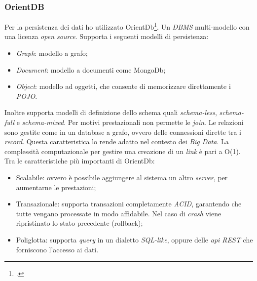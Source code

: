 \subsubsection{OrientDB}
Per la persistenza dei dati ho utilizzato OrientDb\footcite{http://orientdb.com/}. Un \emph{DBMS} multi-modello con una licenza \emph{open source}. Supporta i seguenti modelli di persistenza:
\begin{itemize}
\item \emph{Graph}: modello a grafo; 
\item \emph{Document}: modello a documenti come MongoDb;
\item \emph{Object}: modello ad oggetti, che consente di memorizzare direttamente i \emph{POJO}.
\end{itemize}
Inoltre supporta modelli di definizione dello schema quali \emph{schema-less}, \emph{schema-full} e \emph{schema-mixed}. Per motivi prestazionali non permette le \emph{join}. Le relazioni sono gestite come in un database a grafo, ovvero delle connessioni dirette tra i \emph{record}. Questa caratteristica lo rende adatto nel contesto dei \emph{Big Data}. La complessità computazionale per gestire una creazione di un \emph{link} è pari a O(1). Tra le caratteristiche più importanti di OrientDb:
\begin{itemize}
\item Scalabile: ovvero è possibile aggiungere al sistema un altro \emph{server}, per aumentarne le prestazioni;
\item Transazionale: supporta transazioni completamente \emph{ACID}, garantendo che tutte vengano processate in modo affidabile. Nel caso di \emph{crash} viene ripristinato lo stato precedente (rollback);
\item Poliglotta: supporta \emph{query} in un dialetto \emph{SQL-like}, oppure delle \emph{\gls{api} REST} che forniscono l'accesso ai dati.
\end{itemize}
